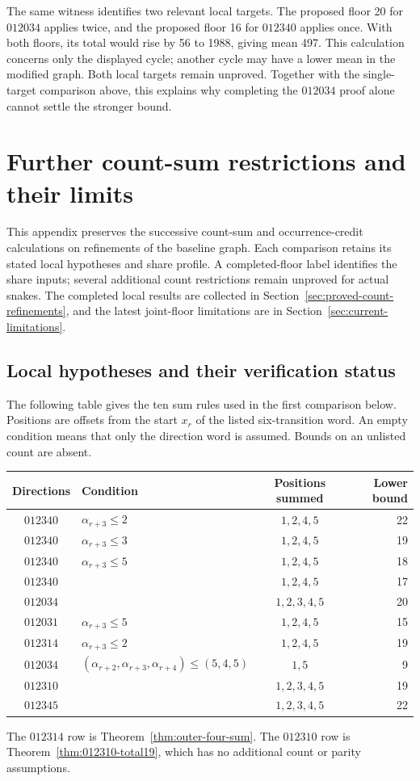 \documentclass[11pt,a4paper]{article}
\theoremstyle{definition}
\theoremstyle{remark}
\begin{document}
The same witness identifies two relevant local targets. The proposed floor
20 for $012034$ applies twice, and the proposed floor 16 for $012340$ applies
once. With both floors, its total would rise by 56 to 1988, giving mean 497.
This calculation concerns only the displayed cycle; another cycle may have
a lower mean in the modified graph. Both local targets remain unproved.
Together with the single-target comparison above, this explains why completing
the $012034$ proof alone cannot settle the stronger bound.

\section{Further count-sum restrictions and their limits}\label{sec:sum-refinements}
This appendix preserves the successive count-sum and occurrence-credit
calculations on refinements of the baseline graph. Each comparison retains
its stated local hypotheses and share profile. A completed-floor label
identifies the share inputs; several additional count restrictions remain
unproved for actual snakes. The completed local results are collected in
Section~\ref{sec:proved-count-refinements}, and the latest joint-floor
limitations are in Section~\ref{sec:current-limitations}.


\subsection{Local hypotheses and their verification status}
The following table gives the ten sum rules used in the first comparison below.
Positions are offsets from the start $x_r$ of the listed six-transition
word. An empty condition means that only the direction word is assumed.
Bounds on an unlisted count are absent.
\begin{center}\small
\begin{tabular}{c l c r}
\toprule
Directions & Condition & Positions summed & Lower bound\\\midrule
$012340$ & $\alpha_{r+3}\le2$ & $1,2,4,5$ & 22\\
$012340$ & $\alpha_{r+3}\le3$ & $1,2,4,5$ & 19\\
$012340$ & $\alpha_{r+3}\le5$ & $1,2,4,5$ & 18\\
$012340$ & & $1,2,4,5$ & 17\\
$012034$ & & $1,2,3,4,5$ & 20\\
$012031$ & $\alpha_{r+3}\le5$ & $1,2,4,5$ & 15\\
$012314$ & $\alpha_{r+3}\le2$ & $1,2,4,5$ & 19\\
$012034$ & $(\alpha_{r+2},\alpha_{r+3},\alpha_{r+4})\le(5,4,5)$ & $1,5$ & 9\\
$012310$ & & $1,2,3,4,5$ & 19\\
$012345$ & & $1,2,3,4,5$ & 22\\\bottomrule
\end{tabular}
\end{center}
The $012314$ row is Theorem~\ref{thm:outer-four-sum}. The $012310$ row is
Theorem~\ref{thm:012310-total19}, which has no additional count or parity assumptions.
\end{document}
